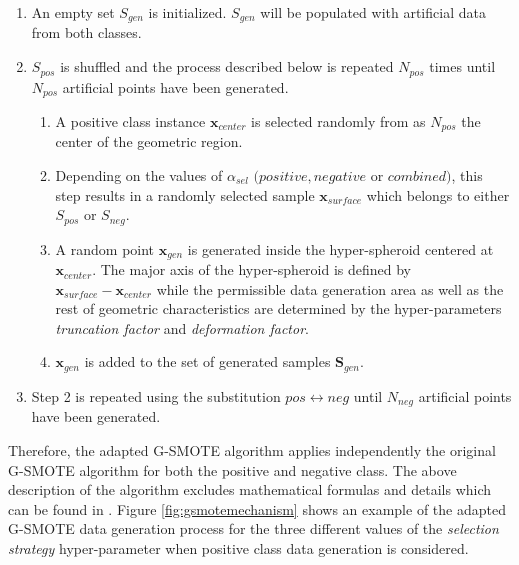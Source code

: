 \documentclass[parskip=full]{scrartcl}
\begin{document}
\begin{enumerate}

\renewcommand{\labelenumii}{\theenumii}
\renewcommand{\theenumii}{\theenumi.\arabic{enumii}.}

	\item An empty set \( S_{gen} \) is initialized. \( S_{gen} \) will be
	populated with artificial data from both classes.

	\item \( S_{pos} \) is shuffled and the process described below is repeated
	\( N_{pos} \) times until \( N_{pos} \) artificial points have been
	generated.

	\begin{enumerate}

		\item A positive class instance \( \textbf{x}_{center} \) is selected
		randomly from as \( N_{pos} \) the center of the geometric region.

		\item Depending on the values of \( \alpha_{sel} \) \( (positive,
		negative \) or \( combined) \), this step results in a randomly selected
		sample \(\textbf{x}_{surface} \) which belongs to either \( S_{pos} \)
		or \( S_{neg} \).

		\item A random point \(\textbf{x}_{gen} \) is generated inside the
		hyper-spheroid centered at \( \textbf{x}_{center} \). The major axis of
		the hyper-spheroid is defined by \( \textbf{x}_{surface} -
		\textbf{x}_{center} \) while the permissible data generation area as
		well as the rest of geometric characteristics are determined by the
		hyper-parameters \textit{truncation factor} and \textit{deformation
		factor}.

		\item \( \textbf{x}_{gen} \) is added to the set of generated samples
		\( \textbf{S}_{gen} \).
	
	\end{enumerate}

	\item Step 2 is repeated using the substitution \( pos \leftrightarrow neg
	\) until \( N_{neg} \) artificial points have been generated.

\end{enumerate}

Therefore, the adapted G-SMOTE algorithm applies independently the original
G-SMOTE algorithm for both the positive and negative class. The above
description of the algorithm excludes mathematical formulas and details which
can be found in \cite{Douzas.2019}. Figure \ref{fig:gsmotemechanism} shows an
example of the adapted G-SMOTE data generation process for the three different
values of the \textit{selection strategy} hyper-parameter when positive class
data generation is considered.
\end{document}
